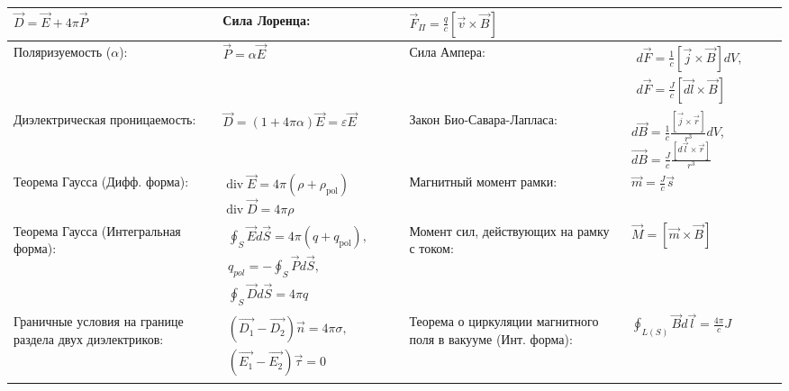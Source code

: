 \documentclass{article}
\begin{document}
\begin{tabular}{ |p{6cm}|p{3.5cm}|p{6cm}|p{3.5cm}|  }
$\vec{D}=\vec{E}+4 \pi \vec{P}$                                            &
Сила Лоренца:                                                              &
$\vec{F}_{\Pi}=\frac{q}{c} [\vec{v} \times \vec{B}]$                       \\
\hline
Поляризуемость ($\alpha$):                                                 &
$\vec{P} = \alpha \vec{E}$                                                 &
Сила Ампера:                                                               &
$\begin{aligned}
d \vec{F}=\frac{1}{c} [\vec{j} \times \vec{B}] d V,  \\
d \vec{F}=\frac{J}{c} [\vec{d{l}} \times \vec{B}]
\end{aligned}$                                                             \\
\hline
Диэлектрическая проницаемость:                                             &
$\vec{D}=(1+4 \pi \alpha) \vec{E}=\varepsilon \vec{E}$                     &
Закон Био-Савара-Лапласа:                                                  &
$d \vec{B}=\frac{1}{c} \frac{[\vec{j} \times \vec{r}]}{r^{3}} d V$,
$\vec{d{B}}=\frac{J}{c} \frac{[d \vec{l} \times \vec{r}]}{r^{3}}$          \\
\hline
Теорема Гаусса (Дифф. форма):                                              &
$\operatorname{div}{\vec{E}} = 4 \pi \left( \rho+\rho_{\mathrm{pol}} \right)$
$\operatorname{div}{\vec{D}} = 4 \pi \rho$                                 &
Магнитный момент рамки:                                                    &
$\vec{m}=\frac{J}{c} \vec{s}$                                              \\
\hline
Теорема Гаусса (Интегральная форма):                                       &
$\begin{aligned}
\oint_{S} \vec{E} d \vec{S}=4 \pi \left(q+q_{\mathrm{pol}}\right),  \\
q_{pol}=-\oint_{S} \vec{P} d \vec{S},                               \\
\oint_{S} \vec{D} d \vec{S}=4 \pi q
\end{aligned}$                                                             &
Момент сил, действующих на рамку с током:                                  &
$\vec{M}= [\vec{m} \times \vec{B}]$                                        \\
\hline
Граничные условия на границе раздела двух диэлектриков:                    &
$\begin{aligned}
(\vec{D_1}-\vec{D_2}) \vec{n} = 4 \pi \sigma,        \\
(\vec{E_1}-\vec{E_2}) \vec{\tau}=0
\end{aligned}$                                                             &
Теорема о циркуляции магнитного поля в вакууме (Инт. форма):               &
$\oint_{L(S)} \vec{B} d \vec{l}=\frac{4 \pi}{c} J$                         \\
\hline
\end{tabular}
\end{document}
